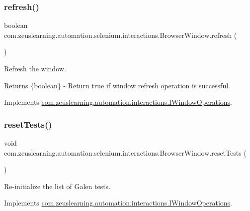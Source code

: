 \subsubsection{\texorpdfstring{refresh()}{refresh()}}
{\footnotesize\ttfamily boolean com.\+zeuslearning.\+automation.\+selenium.\+interactions.\+Browser\+Window.\+refresh (\begin{DoxyParamCaption}{ }\end{DoxyParamCaption})\hspace{0.3cm}{\ttfamily [inline]}}

Refresh the window.

\begin{DoxyReturn}{Returns}
\{boolean\} -\/ Return {\ttfamily true} if window refresh operation is successful. 
\end{DoxyReturn}


Implements \hyperlink{interfacecom_1_1zeuslearning_1_1automation_1_1interactions_1_1IWindowOperations_afdd3ee64ae88246ef6f4006dcf6b094e}{com.\+zeuslearning.\+automation.\+interactions.\+I\+Window\+Operations}.

\hypertarget{classcom_1_1zeuslearning_1_1automation_1_1selenium_1_1interactions_1_1BrowserWindow_aeed389e302169c0d1e6aae40e395fa68}{}\label{classcom_1_1zeuslearning_1_1automation_1_1selenium_1_1interactions_1_1BrowserWindow_aeed389e302169c0d1e6aae40e395fa68} 
\subsubsection{\texorpdfstring{reset\+Tests()}{resetTests()}}
{\footnotesize\ttfamily void com.\+zeuslearning.\+automation.\+selenium.\+interactions.\+Browser\+Window.\+reset\+Tests (\begin{DoxyParamCaption}{ }\end{DoxyParamCaption})\hspace{0.3cm}{\ttfamily [inline]}}

Re-\/initialize the list of Galen tests. 

Implements \hyperlink{interfacecom_1_1zeuslearning_1_1automation_1_1interactions_1_1IWindowOperations_adcf63fd0973053422e1cfdb7221e6a13}{com.\+zeuslearning.\+automation.\+interactions.\+I\+Window\+Operations}.


